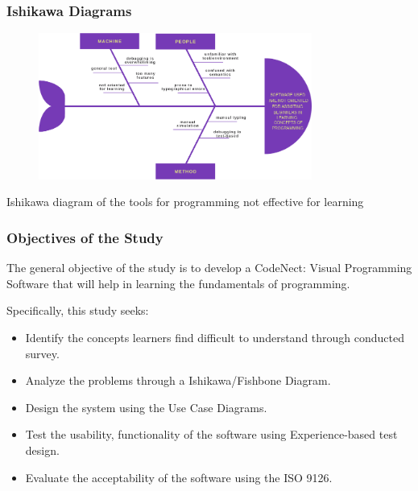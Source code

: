 \documentclass{beamer}
\newcommand{\parx}{
	\setlength{\parindent}{4em}
	\par}
\begin{document}
\begin{frame}
	\frametitle{Ishikawa Diagrams}
	\begin{figure}
		\includegraphics[width=0.8\textwidth]{figures/fishbone3.png}
	\end{figure}
	\centering
	Ishikawa diagram of the tools for programming not effective for learning
\end{frame}

\begin{frame}
	\frametitle{Objectives of the Study}
	\justifying
	\parx
	The general objective of the study is to develop a CodeNect: Visual Programming
	Software that will help in learning the fundamentals of programming.

	\parx
	Specifically, this study seeks:

	\begin{itemize}
		\item<1-> Identify the concepts learners find difficult to understand through conducted survey.
		\item<2-> Analyze the problems through a Ishikawa/Fishbone Diagram.
		\item<3-> Design the system using the Use Case Diagrams.
		\item<4-> Test the usability, functionality of the software using Experience-based test design.
		\item<5-> Evaluate the acceptability of the software using the ISO 9126.
	\end{itemize}
\end{frame}
\end{document}
